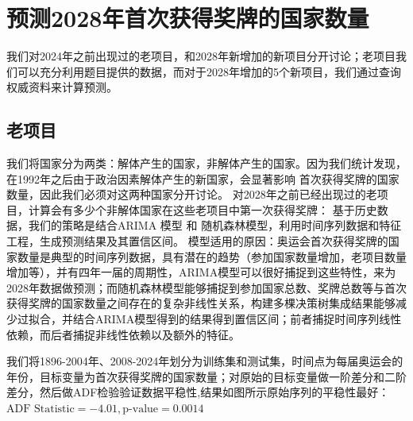 \documentclass[UTF8]{ctexart}
\begin{document}
\section{预测2028年首次获得奖牌的国家数量}
我们对2024年之前出现过的老项目，和2028年新增加的新项目分开讨论；老项目我们可以充分利用题目提供的数据，而对于2028年增加的5个新项目，我们通过查询权威资料来计算预测。

\subsection{老项目}
我们将国家分为两类：解体产生的国家，非解体产生的国家。因为我们统计发现，在1992年之后由于政治因素解体产生的新国家，会显著影响
首次获得奖牌的国家数量，因此我们必须对这两种国家分开讨论。
对2028年之前已经出现过的老项目，计算会有多少个非解体国家在这些老项目中第一次获得奖牌：
基于历史数据，我们的策略是结合ARIMA 模型 和 随机森林模型，利用时间序列数据和特征工程，生成预测结果及其置信区间。
模型适用的原因：奥运会首次获得奖牌的国家数量是典型的时间序列数据，具有潜在的趋势（参加国家数量增加，老项目数量增加等），并有四年一届的周期性，ARIMA模型可以很好捕捉到这些特性，来为2028年数据做预测；而随机森林模型能够捕捉到参加国家总数、奖牌总数等与首次获得奖牌的国家数量之间存在的复杂非线性关系，构建多棵决策树集成结果能够减少过拟合，并结合ARIMA模型得到的结果得到置信区间；前者捕捉时间序列线性依赖，而后者捕捉非线性依赖以及额外的特征。

我们将1896-2004年、2008-2024年划分为训练集和测试集，时间点为每届奥运会的年份，目标变量为首次获得奖牌的国家数量；对原始的目标变量做一阶差分和二阶差分，然后做ADF检验验证数据平稳性,结果如图所示原始序列的平稳性最好：
$\text{ADF Statistic}=-4.01,\text{p-value}=0.0014$
\end{document}
